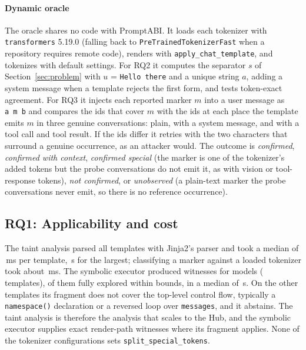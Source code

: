 \documentclass[10pt,conference]{IEEEtran}
\newcommand{\tool}{PromptABI\xspace}
\begin{document}
\paragraph{Dynamic oracle} The oracle shares no code with \tool. It loads each
tokenizer with \texttt{transformers} 5.19.0 (falling back to
\texttt{PreTrainedTokenizerFast} when a repository requires remote code),
renders with \texttt{apply\_chat\_template}, and tokenizes with default
settings. For RQ2 it computes the separator $s$ of Section~\ref{sec:problem}
with $u$ = \texttt{Hello there} and a unique string $a$, adding a system
message when a template rejects the first form, and tests token-exact
agreement. For RQ3 it injects each reported marker $m$ into a user message as
\texttt{a~m~b} and compares the ids that cover $m$ with the ids at each place
the template emits $m$ in three genuine conversations: plain, with a system
message, and with a tool call and tool result. If the ids differ it retries
with the two characters that surround a genuine occurrence, as an attacker
would. The outcome is \emph{confirmed}, \emph{confirmed with context},
\emph{confirmed special} (the marker is one of the tokenizer's added tokens
but the probe conversations do not emit it, as with vision or tool-response
tokens), \emph{not confirmed}, or \emph{unobserved} (a plain-text marker the
probe conversations never emit, so there is no reference occurrence).

\subsection{RQ1: Applicability and cost}

The taint analysis parsed all \TaintParsedTpl{} templates with Jinja2's parser
and took a median of \TaintMedianMs{}\,ms per template, \TaintMaxSec{}\,s for
the largest; classifying a marker against a loaded tokenizer took about
\CompMedianMs{}\,ms. The symbolic executor produced witnesses for
\SymFlagModels{} models (\SymFlagTpl{} templates), \SymCompleteTpl{} of them
fully explored within bounds, in a median of \SymMedianSec{}\,s. On the other
\SymAbstainTpl{} templates its fragment does not cover the top-level control
flow, typically a \texttt{namespace()} declaration or a reversed loop over
\texttt{messages}, and it abstains. The taint analysis is therefore the
analysis that scales to the Hub, and the symbolic executor supplies exact
render-path witnesses where its fragment applies. None of the \NModels{}
tokenizer configurations sets \texttt{split\_special\_tokens}.
\end{document}

